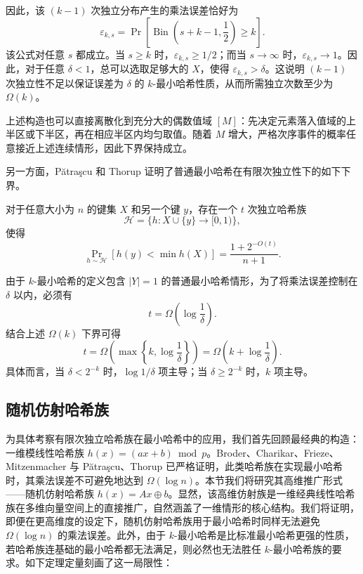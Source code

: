 因此，该 $(k-1)$ 次独立分布产生的乘法误差恰好为
$$
    \varepsilon_{k,s}
    =
    \Pr\left[
        \operatorname{Bin}\left(s+k-1,\frac12\right)\ge k
    \right].
$$
该公式对任意 $s$ 都成立。当 $s\ge k$ 时，$\varepsilon_{k,s}\ge 1/2$；而当 $s\to\infty$ 时，$\varepsilon_{k,s}\to1$。因此，对于任意 $\delta<1$，总可以选取足够大的 $X$，使得 $\varepsilon_{k,s}>\delta$。这说明 $(k-1)$ 次独立性不足以保证误差为 $\delta$ 的 $k$-最小哈希性质，从而所需独立次数至少为 $\Omega(k)$。

上述构造也可以直接离散化到充分大的偶数值域 $[M]$：先决定元素落入值域的上半区或下半区，再在相应半区内均匀取值。随着 $M$ 增大，严格次序事件的概率任意接近上述连续情形，因此下界保持成立。

另一方面，Pătraşcu 和 Thorup \cite{PT_lb_t_wise_min_wise} 证明了普通最小哈希在有限次独立性下的如下下界。

\begin{theorem}\label{thm:PT_lb_t_wise_min_wise}
    对于任意大小为 $n$ 的键集 $X$ 和另一个键 $y$，存在一个 $t$ 次独立哈希族
    $$
        \mathcal H=\{h:X\cup\{y\}\to[0,1)\},
    $$
    使得
    $$
        \Pr_{h\sim\mathcal H}[h(y)<\min h(X)]
        =
        \frac{1+2^{-O(t)}}{n+1}.
    $$
\end{theorem}

由于 $k$-最小哈希的定义包含 $|Y|=1$ 的普通最小哈希情形，为了将乘法误差控制在 $\delta$ 以内，必须有
$$
    t=\Omega\left(\log\frac{1}{\delta}\right).
$$
结合上述 $\Omega(k)$ 下界可得
$$
    t
    =
    \Omega\left(
        \max\left\{
            k,\log\frac{1}{\delta}
        \right\}
    \right)
    =
    \Omega\left(
        k+\log\frac{1}{\delta}
    \right).
$$
具体而言，当 $\delta<2^{-k}$ 时，$\log 1/\delta$ 项主导；当 $\delta\ge2^{-k}$ 时，$k$ 项主导。

\subsection{随机仿射哈希族}\label{sec:affine_hash}

为具体考察有限次独立哈希族在最小哈希中的应用，我们首先回顾最经典的构造：一维模线性哈希族 $h(x) = (ax + b) \bmod p$。Broder、Charikar、Frieze、Mitzenmacher \cite{BCFM98} 与 P{\u{a}}tra{\c{s}}cu、Thorup \cite{PT_lb_t_wise_min_wise} 已严格证明，此类哈希族在实现最小哈希时，其乘法误差不可避免地达到 $\Omega(\log n)$。本节我们将研究其高维推广形式——随机仿射哈希族 $h(x) = Ax \oplus b$。显然，该高维仿射族是一维经典线性哈希族在多维向量空间上的直接推广，自然涵盖了一维情形的核心结构。我们将证明，即便在更高维度的设定下，随机仿射哈希族用于最小哈希时同样无法避免 $\Omega(\log n)$ 的乘法误差。此外，由于 $k$-最小哈希是比标准最小哈希更强的性质，若哈希族连基础的最小哈希都无法满足，则必然也无法胜任 $k$-最小哈希族的要求。如下定理定量刻画了这一局限性：

